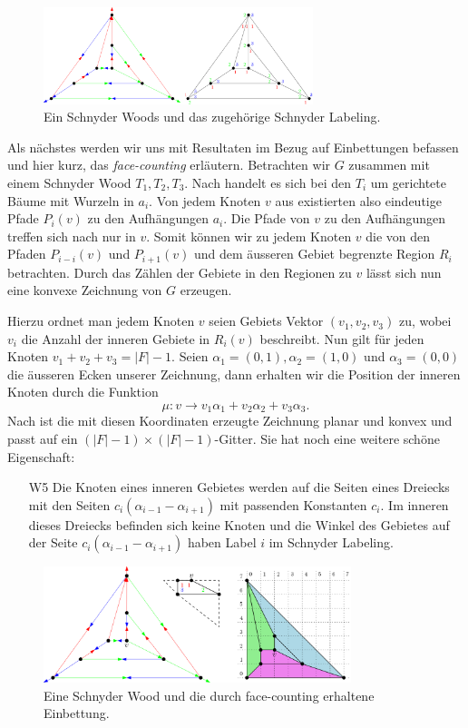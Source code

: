 \begin{figure}[h]
	\centering
  \includegraphics[width=0.7\textwidth]{schnyder_bij_ex.png}
	\caption{Ein Schnyder Woods und das zugehörige Schnyder Labeling.}
\end{figure}

Als nächstes werden wir uns mit Resultaten im Bezug auf Einbettungen befassen und hier kurz, das \textit{face-counting} \cite{felsner01} erläutern. Betrachten wir $G$ zusammen mit einem Schnyder Wood $T_1,T_2,T_3$. Nach \cite[Korollar 2.5]{felsner04} handelt es sich bei den $T_i$ um gerichtete Bäume mit Wurzeln in $a_i$. Von jedem Knoten $v$ aus existierten also eindeutige Pfade $P_i(v)$ zu den Aufhängungen $a_i$. Die Pfade von $v$ zu den Aufhängungen treffen sich nach \cite[Lemma 2.4]{felsner04} nur in $v$. Somit können wir zu jedem Knoten $v$ die von den Pfaden $P_{i-i}(v)$ und $P_{i+1}(v)$ und dem äusseren Gebiet begrenzte Region $R_i$ betrachten. Durch das Zählen der Gebiete in den Regionen zu $v$ lässt sich nun eine konvexe Zeichnung von $G$ erzeugen. \

Hierzu ordnet man jedem Knoten $v$ seien Gebiets Vektor $(v_1,v_2,v_3)$ zu, wobei $v_i$ die Anzahl der inneren Gebiete in $R_i(v)$ beschreibt. Nun gilt für jeden Knoten $v_1+v_2+v_3 = |F|-1$. Seien $\alpha_1 = (0,1),\alpha_2 = (1,0)$ und $\alpha_3 = (0,0)$ die äusseren Ecken unserer Zeichnung, dann erhalten wir die Position der inneren Knoten durch die Funktion 
$$\mu:v\to v_1\alpha_1 + v_2\alpha_2+v_3\alpha_3.$$ 
Nach \cite[Theorem 2.7]{felsner04} ist die mit diesen Koordinaten erzeugte Zeichnung planar und konvex und passt auf ein $(|F|-1)\times(|F|-1)$-Gitter. Sie hat noch eine weitere schöne Eigenschaft:

\begin{itemize}
\item [W5] Die Knoten eines inneren Gebietes werden auf die Seiten eines Dreiecks mit den Seiten $c_i(\alpha_{i-1}-\alpha_{i+1})$ mit passenden Konstanten $c_i$. Im inneren dieses Dreiecks befinden sich keine Knoten und die Winkel des Gebietes auf der Seite $c_i(\alpha_{i-1}-\alpha_{i+1})$ haben Label $i$ im Schnyder Labeling.
\end{itemize}

\begin{figure}[h]
	\centering
  \includegraphics[width=0.8\textwidth]{face_counting.png}
	\caption{Eine Schnyder Wood und die durch face-counting erhaltene Einbettung.}
	\label{face_counting}
\end{figure}
